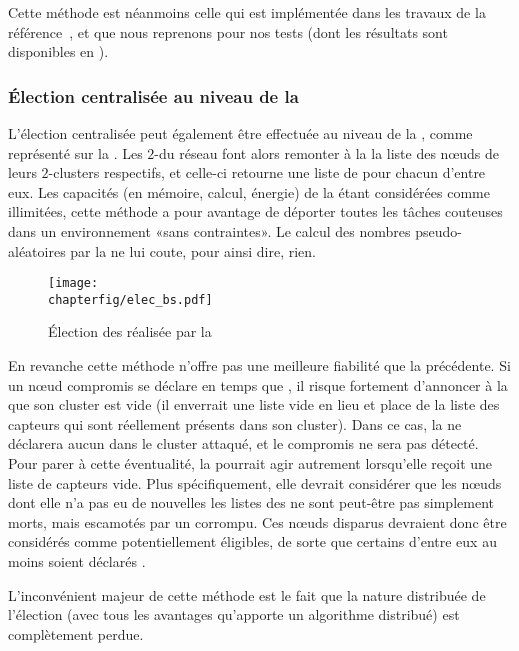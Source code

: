 Cette méthode est néanmoins celle qui est implémentée dans les travaux de la référence~\cite{GMT12}, et que nous reprenons pour nos tests (dont les résultats sont disponibles en ).

        \subsubsection{Élection centralisée au niveau de la \sdb}
L'élection centralisée peut également être effectuée au niveau de la \sdb, comme représenté sur la .
Les $2$-\CH du réseau font alors remonter à la \sdb la liste des nœuds de leurs $2$-clusters respectifs, et celle-ci retourne une liste de \cns pour chacun d'entre eux.
Les capacités (en mémoire, calcul, énergie) de la \sdb étant considérées comme illimitées, cette méthode a pour avantage de déporter toutes les tâches couteuses dans un environnement «sans contraintes».
Le calcul des nombres pseudo-aléatoires par la \sdb ne lui coute, pour ainsi dire, rien.
\begin{figure}[ht]
    \centering
    \texttt{[image: \\chapterfig/elec\_bs.pdf]}
    \caption{Élection des \cns réalisée par la \sdb}\label{sa:fig:elecbs}
\end{figure}

En revanche cette méthode n'offre pas une meilleure fiabilité que la précédente.
Si un nœud compromis se déclare en temps que \CH, il risque fortement d'annoncer à la \sdb que son cluster est vide (il enverrait une liste vide en lieu et place de la liste des capteurs qui sont réellement présents dans son cluster).
Dans ce cas, la \sdb ne déclarera aucun \cn dans le cluster attaqué, et le \CH compromis ne sera pas détecté.
Pour parer à cette éventualité, la \sdb pourrait agir autrement lorsqu'elle reçoit une liste de capteurs vide.
Plus spécifiquement, elle devrait considérer que les nœuds dont elle n'a pas eu de nouvelles \via les listes des \CH ne sont peut-être pas simplement morts, mais escamotés par un \ch corrompu.
Ces nœuds disparus devraient donc être considérés comme potentiellement éligibles, de sorte que certains d'entre eux au moins soient déclarés \cns.

L'inconvénient majeur de cette méthode est le fait que la nature distribuée de l'élection (avec tous les avantages qu'apporte un algorithme distribué) est complètement
perdue.

